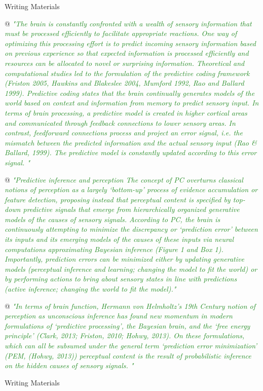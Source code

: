\documentclass[utf8]{article}
\newenvironment{writingMaterials}
			{	
				\begin{tcolorbox}[size=small, colframe=black!20!white, toprule=1mm]
					Writing Materials
				\end{tcolorbox}

				\begin{easylist}[itemize]		
			}
			{
				\end{easylist}
				\begin{tcolorbox}[size=small, bottomrule=1mm, halign=flush right, colframe=black!20!white]
					Writing Materials
				\end{tcolorbox}			
			}
\newcommand{\rewrite}[1]{\textcolor{ForestGreen}{\textit{"#1"}}\newline}
\begin{document}
\begin{writingMaterials}
				
				@ \rewrite{The brain is constantly confronted with a wealth of sensory information that must be processed efficiently to facilitate appropriate reactions. One way of optimizing this processing effort is to predict incoming sensory information based on previous experience so that expected information is processed efficiently and resources can be allocated to novel or surprising information. Theoretical and computational studies led to the formulation of the predictive coding framework (Friston 2005, Hawkins and Blakeslee 2004, Mumford 1992, Rao and Ballard 1999). Predictive coding states that the brain continually generates models of the world based on context and information from memory to predict sensory input. In terms of brain processing, a predictive model is created in higher cortical areas and communicated through feedback connections to lower sensory areas. In contrast, feedforward connections process and project an error signal, i.e. the mismatch between the predicted information and the actual sensory input (Rao \& Ballard, 1999). The predictive model is constantly updated according to this error signal. }


				
				
				@ \rewrite{Predictive inference and perception The concept of PC overturns classical notions of perception as a largely ‘bottom-up’ process of evidence accumulation or feature detection, proposing instead that perceptual content is speciﬁed by top-down predictive signals that emerge from hierarchically organized generative models of the causes of sensory signals. According to PC, the brain is continuously attempting to minimize the discrepancy or ‘prediction error’ between its inputs and its emerging models of the causes of these inputs via neural computations approximating Bayesian inference (Figure 1 and Box 1). Importantly, prediction errors can be minimized either by updating generative models (perceptual inference and learning; changing the model to ﬁt the world) or by performing actions to bring about sensory states in line with predictions (active inference; changing the world to ﬁt the model).}
				
				@ \rewrite{In terms of brain function, Hermann von Helmholtz’s 19th Century notion of perception as unconscious inference has found new momentum in modern formulations of ‘predictive processing’, the Bayesian brain, and the ‘free energy principle’ (Clark, 2013; Friston, 2010; Hohwy, 2013). On these formulations, which can all be subsumed under the general term ‘prediction error minimization’ (PEM, (Hohwy, 2013)) perceptual content is the result of probabilistic inference on the hidden causes of sensory signals. }
				

\end{writingMaterials}
\end{document}
